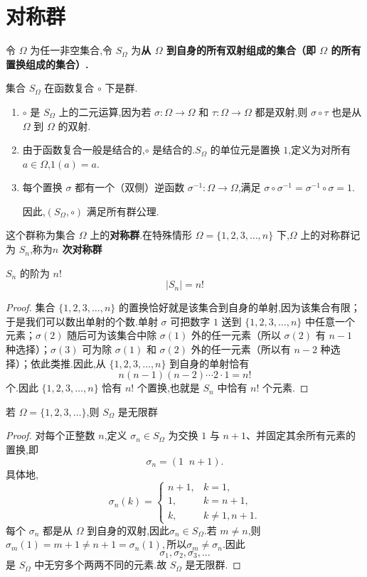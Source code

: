 \section{对称群}
令 $\Omega$ 为任一非空集合,令 $S_\Omega$ 为\textbf{从 $\Omega$ 到自身的所有双射组成的集合（即 $\Omega$ 的所有置换组成的集合）.}

集合 $S_\Omega$ 在函数复合 $\circ$ 下是群.
\begin{enumerate}[label=(\arabic*)]
	\item $\circ$ 是 $S_\Omega$ 上的二元运算,因为若 $\sigma:\Omega\to\Omega$ 和 $\tau:\Omega\to\Omega$ 都是双射,则 $\sigma\circ\tau$ 也是从 $\Omega$ 到 $\Omega$ 的双射.
	\item 由于函数复合一般是结合的,$\circ$ 是结合的.$S_\Omega$ 的单位元是置换 $1$,定义为对所有 $a\in\Omega$,$1(a)=a$.
	\item 每个置换 $\sigma$ 都有一个（双侧）逆函数 $\sigma^{-1}:\Omega\to\Omega$,满足 $\sigma\circ\sigma^{-1}=\sigma^{-1}\circ\sigma=1$.
	
	因此,$(S_\Omega,\circ)$ 满足所有群公理.
\end{enumerate}
\begin{definition}
这个群称为集合 $\Omega$ 上的\textbf{对称群}.在特殊情形 $\Omega=\{1,2,3,\ldots,n\}$ 下,$\Omega$ 上的对称群记为 $S_n$,称为\textbf{$n$ 次对称群}
\end{definition}
\begin{proposition}
	$S_n$ 的阶为 $n!$
	\[|S_n |=n!\]
\end{proposition}
\begin{proof}
	集合 $\{1,2,3,\ldots,n\}$ 的置换恰好就是该集合到自身的单射,因为该集合有限；于是我们可以数出单射的个数.单射 $\sigma$ 可把数字 $1$ 送到 $\{1,2,3,\ldots,n\}$ 中任意一个元素；$\sigma(2)$ 随后可为该集合中除 $\sigma(1)$ 外的任一元素（所以 $\sigma(2)$ 有 $n-1$ 种选择）；$\sigma(3)$ 可为除 $\sigma(1)$ 和 $\sigma(2)$ 外的任一元素（所以有 $n-2$ 种选择）；依此类推.因此,从 $\{1,2,3,\ldots,n\}$ 到自身的单射恰有
	\[
	n(n-1)(n-2)\cdots 2\cdot1=n!
	\]
	个.因此 $\{1,2,3,\ldots,n\}$ 恰有 $n!$ 个置换,也就是 $S_n$ 中恰有 $n!$ 个元素.
\end{proof}


\begin{proposition}
	若 $\Omega=\{1,2,3,\ldots\}$,则 $S_\Omega$ 是无限群
\end{proposition}

\begin{proof}
	对每个正整数 $n$,定义 $\sigma_n\in S_\Omega$ 为交换 $1$ 与 $n+1$、并固定其余所有元素的置换,即
	\[
	\sigma_n=(1\;\;n+1).
	\]
	具体地,
	\[
	\sigma_n(k)=
	\begin{cases}
		n+1, & k=1,\\
		1,   & k=n+1,\\
		k,   & k\neq 1,n+1.
	\end{cases}
	\]
	每个 $\sigma_n$ 都是从 $\Omega$ 到自身的双射,因此$\sigma_n\in S_\Omega.$若 $m\neq n$,则$\sigma_m(1)=m+1\neq n+1=\sigma_n(1),$所以$\sigma_m\neq \sigma_n.$因此
	\[
	\sigma_1,\sigma_2,\sigma_3,\ldots
	\]
	是 $S_\Omega$ 中无穷多个两两不同的元素.故 $S_\Omega$ 是无限群.
\end{proof}


